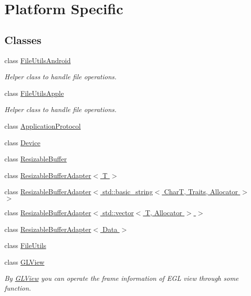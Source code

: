\hypertarget{group__platform}{}\section{Platform Specific}
\label{group__platform}
\subsection*{Classes}
\begin{DoxyCompactItemize}
\item 
class \hyperlink{classFileUtilsAndroid}{File\+Utils\+Android}
\begin{DoxyCompactList}\small\item\em Helper class to handle file operations. \end{DoxyCompactList}\item 
class \hyperlink{classFileUtilsApple}{File\+Utils\+Apple}
\begin{DoxyCompactList}\small\item\em Helper class to handle file operations. \end{DoxyCompactList}\item 
class \hyperlink{classApplicationProtocol}{Application\+Protocol}
\item 
class \hyperlink{classDevice}{Device}
\item 
class \hyperlink{classResizableBuffer}{Resizable\+Buffer}
\item 
class \hyperlink{classResizableBufferAdapter}{Resizable\+Buffer\+Adapter$<$ T $>$}
\item 
class \hyperlink{classResizableBufferAdapter_3_01std_1_1basic__string_3_01CharT_00_01Traits_00_01Allocator_01_4_01_4}{Resizable\+Buffer\+Adapter$<$ std\+::basic\+\_\+string$<$ Char\+T, Traits, Allocator $>$ $>$}
\item 
class \hyperlink{classResizableBufferAdapter_3_01std_1_1vector_3_01T_00_01Allocator_01_4_01_4}{Resizable\+Buffer\+Adapter$<$ std\+::vector$<$ T, Allocator $>$ $>$}
\item 
class \hyperlink{classResizableBufferAdapter_3_01Data_01_4}{Resizable\+Buffer\+Adapter$<$ Data $>$}
\item 
class \hyperlink{classFileUtils}{File\+Utils}
\item 
class \hyperlink{classGLView}{G\+L\+View}
\begin{DoxyCompactList}\small\item\em By \hyperlink{classGLView}{G\+L\+View} you can operate the frame information of E\+GL view through some function. \end{DoxyCompactList}\item 

\end{DoxyCompactItemize}
